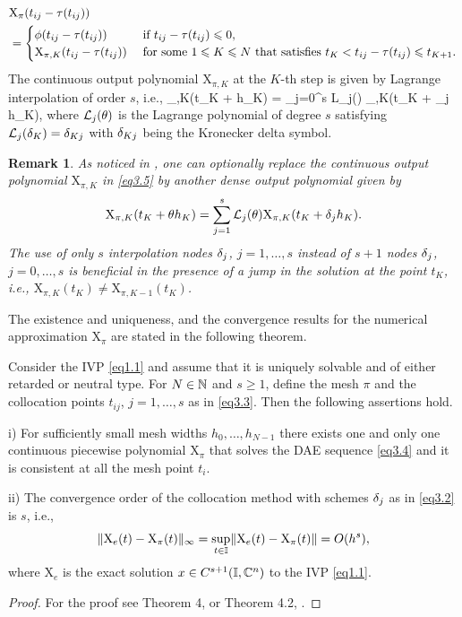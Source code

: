 \documentclass[final,reqno]{siamltex}
\newtheorem{remark}[theorem]{Remark}
\begin{document}
%
\[
\begin{split} 
 & \mathrm{X}_{\pi}(t_{ij}-\tau(t_{ij})) \\
 & =  
 \begin{cases}
  \phi(t_{ij}-\tau(t_{ij}))                & \mbox{ if } t_{ij}-\tau(t_{ij}) \leqslant 0, \\
  \mathrm{X}_{\pi,K}(t_{ij}-\tau(t_{ij}))  & \mbox{ for some $ 1 \leqslant K \leqslant N$ that satisfies } t_K < t_{ij}-\tau(t_{ij}) \leqslant t_{K+1}.
 \end{cases}
 \end{split} 
\]
%
The continuous output polynomial $\mathrm{X}_{\pi,K}$ at the $K$-th step is given by Lagrange interpolation of order $s$, i.e.,
%
\be\label{eq3.5}
 _{\pi,K}(t_K + \tet h_K) = \sum_{j=0}^s {\cal L}_j(\tet) _{\pi,K}(t_K + \de_j h_K),
\ee
%
where ${\cal L}_j(\tet)$ is the Lagrange polynomial of degree $s$ satisfying ${\cal L}_j(\de_K) = \de_{Kj}$ with $\delta_{Kj}$ being the Kronecker delta symbol.

\begin{remark}
 As noticed in \cite{GugH01,GugH07}, one can optionally replace the continuous output polynomial $\mathrm{X}_{\pi,K}$ in \eqref{eq3.5} by another dense output polynomial given by
 \[
  \mathrm{X}_{\pi,K}(t_K + \tet h_K) = \sum_{j=1}^s {\cal L}_j(\tet) \mathrm{X}_{\pi,K}(t_K + \de_j h_K).
 \]
 The use of only $s$ interpolation nodes $\delta_j$, $j=1,\dots,s$ instead of $s+1$ nodes $\delta_j$, $j=0,\dots,s$ is beneficial in the presence of a jump in the solution at the
 point $t_K$, i.e., $\mathrm{X}_{\pi,K}(t_K) \not= \mathrm{X}_{\pi,K-1}(t_K)$.
\end{remark}

The existence and uniqueness, and the convergence results for the numerical approximation $\mathrm{X}_{\pi}$ are stated in the following theorem.

\begin{theorem}\label{Thm6.1}
Consider the IVP \eqref{eq1.1} and assume that it is uniquely solvable and of either retarded or neutral type. 
For $N \in \mathbb{N}$ and $s \geq 1$, define the mesh $\pi$ and the collocation points $t_{ij}$, $j=1,\dots,s$ as in \eqref{eq3.3}. 
Then the following assertions hold.
\begin{compactenum}
 \item[i)] For sufficiently small mesh widths $h_0,\dots,h_{N-1}$ there exists one and only one continuous piecewise polynomial $\mathrm{X}_{\pi}$ that solves 
 the DAE sequence \eqref{eq3.4} and it is consistent at all the mesh point $t_i$.
 \item[ii)] The convergence order of the collocation method with schemes $\delta_j$ as in \eqref{eq3.2} is $s$, i.e., 
 \[
  \| \mathrm{X}_e(t) - \mathrm{X}_{\pi}(t) \|_{\infty} = \underset{t \in \mathbb{I}}{\sup} \| \mathrm{X}_e(t) - \mathrm{X}_{\pi}(t) \| = O(h^s),
 \]
%
 where $\mathrm{X}_e$ is the exact solution  $x \in C^{s+1}(\mathbb{I},\mathbb{C}^n)$ to the IVP \eqref{eq1.1}.
\end{compactenum}
\end{theorem}
\begin{proof}
For the proof see Theorem 4, \cite{Hau97} or Theorem 4.2, \cite{GugH07}.
\end{proof}
%
\end{document}
